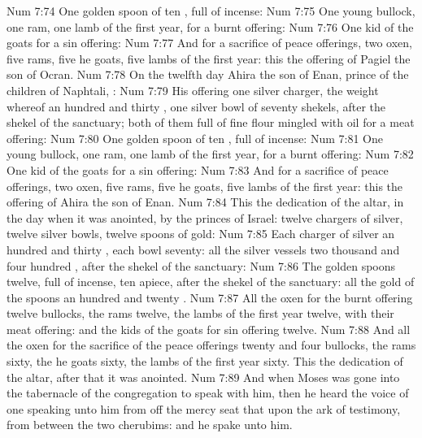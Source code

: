 \vs Num 7:74 One golden spoon of ten , full of incense:
\vs Num 7:75 One young bullock, one ram, one lamb of the first year, for a burnt offering:
\vs Num 7:76 One kid of the goats for a sin offering:
\vs Num 7:77 And for a sacrifice of peace offerings, two oxen, five rams, five he goats, five lambs of the first year: this  the offering of Pagiel the son of Ocran.
\vs Num 7:78 On the twelfth day Ahira the son of Enan, prince of the children of Naphtali, :
\vs Num 7:79 His offering  one silver charger, the weight whereof  an hundred and thirty , one silver bowl of seventy shekels, after the shekel of the sanctuary; both of them full of fine flour mingled with oil for a meat offering:
\vs Num 7:80 One golden spoon of ten , full of incense:
\vs Num 7:81 One young bullock, one ram, one lamb of the first year, for a burnt offering:
\vs Num 7:82 One kid of the goats for a sin offering:
\vs Num 7:83 And for a sacrifice of peace offerings, two oxen, five rams, five he goats, five lambs of the first year: this  the offering of Ahira the son of Enan.
\vs Num 7:84 This  the dedication of the altar, in the day when it was anointed, by the princes of Israel: twelve chargers of silver, twelve silver bowls, twelve spoons of gold:
\vs Num 7:85 Each charger of silver  an hundred and thirty , each bowl seventy: all the silver vessels  two thousand and four hundred , after the shekel of the sanctuary:
\vs Num 7:86 The golden spoons  twelve, full of incense,  ten  apiece, after the shekel of the sanctuary: all the gold of the spoons  an hundred and twenty .
\vs Num 7:87 All the oxen for the burnt offering  twelve bullocks, the rams twelve, the lambs of the first year twelve, with their meat offering: and the kids of the goats for sin offering twelve.
\vs Num 7:88 And all the oxen for the sacrifice of the peace offerings  twenty and four bullocks, the rams sixty, the he goats sixty, the lambs of the first year sixty. This  the dedication of the altar, after that it was anointed.
\vs Num 7:89 And when Moses was gone into the tabernacle of the congregation to speak with him, then he heard the voice of one speaking unto him from off the mercy seat that  upon the ark of testimony, from between the two cherubims: and he spake unto him.
